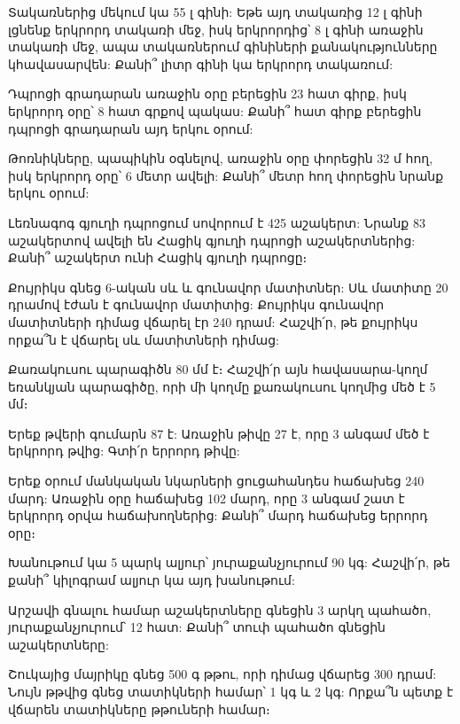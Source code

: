 \problem
Տակառներից մեկում կա 55 լ գինի: Եթե այդ տակառից 12 լ 
գինի լցնենք երկրորդ տակառի մեջ, իսկ երկրորդից՝ 8 լ գինի 
առաջին տակառի մեջ, ապա տակառներում գինիների քանակությունները 
կհավասարվեն: Քանի՞ լիտր գինի կա երկրորդ տակառում:

\problem
Դպրոցի գրադարան առաջին օրը բերեցին 23 հատ գիրք, իսկ երկրորդ 
օրը՝ 8 հատ գրքով պակաս: Քանի՞ հատ գիրք բերեցին դպրոցի գրադարան 
այդ երկու օրում:

\problem
Թոռնիկները, պապիկին օգնելով, առաջին օրը փորեցին 32 մ հող, իսկ 
երկրորդ օրը՝ 6 մետր ավելի: Քանի՞ մետր հող փորեցին նրանք երկու օրում:

\problem
Լեռնագոգ գյուղի դպրոցում սովորում է 425 աշակերտ: Նրանք 83 
աշակերտով ավելի են Հացիկ գյուղի դպրոցի աշակերտներից: Քանի՞ 
աշակերտ ունի Հացիկ գյուղի դպրոցը։

\problem
Քույրիկս գնեց 6-ական սև և գունավոր մատիտներ: Սև մատիտը 20 
դրամով էժան է գունավոր մատիտից: Քույրիկս գունավոր մատիտների 
դիմաց վճարել էր 240 դրամ: Հաշվի՛ր, թե քույրիկս որքա՞ն է վճարել 
սև մատիտների դիմաց:

\problem
Քառակուսու պարագիծն 80 մմ է։ Հաշվի՛ր այն հավասարա-կողմ եռանկյան 
պարագիծը, որի մի կողմը քառակուսու կողմից մեծ է 5 մմ։

\problem
Երեք թվերի գումարն 87 է: Առաջին թիվը 27 է, որը 3 անգամ մեծ է 
երկրորդ թվից: Գտի՛ր երրորդ թիվը:

\problem
Երեք օրում մանկական նկարների ցուցահանդես հաճախեց 240 մարդ: Առաջին 
օրը հաճախեց 102 մարդ, որը 3 անգամ շատ է երկրորդ օրվա հաճախողներից: 
Քանի՞ մարդ հաճախեց երրորդ օրը։





\problem
Խանութում կա 5 պարկ ալյուր՝ յուրաքանչյուրում 90 կգ: Հաշվի՛ր, թե 
քանի՞ կիլոգրամ ալյուր կա այդ խանութում:

\problem
Արշավի գնալու համար աշակերտները գնեցին 3 արկղ պահածո, յուրաքանչյուրում՝ 
12 հատ: Քանի՞ տուփ պահածո գնեցին աշակերտները:

\problem
Շուկայից մայրիկը գնեց 500 գ թթու, որի դիմաց վճարեց 300 դրամ: Նույն 
թթվից գնեց տատիկների համար՝ 1 կգ և 2 կգ: Որքա՞ն պետք է վճարեն 
տատիկները թթուների համար։





\bye
